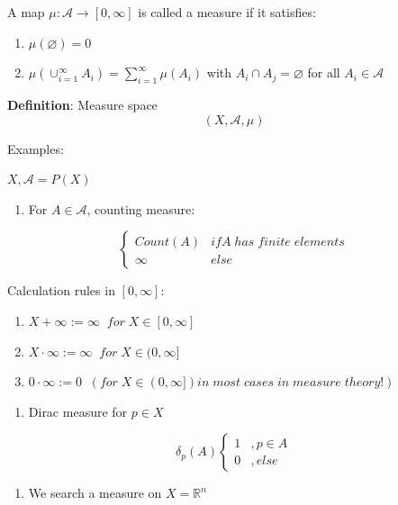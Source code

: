 \documentclass[
]{book}
\providecommand{\tightlist}{%
  \setlength{\itemsep}{0pt}\setlength{\parskip}{0pt}}
\begin{document}
A map \(\mu: \mathcal{A} \rightarrow [0, \infty]\) is called a measure if it satisfies:

\begin{enumerate}
\def\labelenumi{(\alph{enumi})}
\item
  \(\mu (\varnothing)=0\)
\item
  \(\mu(\cup_{i=1}^\infty A_i)=\sum_{i=1}^\infty \mu(A_i)\) with \(A_i \cap A_j = \varnothing\) for all \(A_i \in \mathcal{A}\)
\end{enumerate}

\textbf{Definition}: Measure space \[(X,\mathcal{A}, \mu)\]

Examples:

\(X, \mathcal{A}=P(X)\)

\begin{enumerate}
\def\labelenumi{(\alph{enumi})}
\tightlist
\item
  For \(A\in \mathcal{A}\), counting measure:
\end{enumerate}

\[\begin{cases}  Count(A) & if A \; has\; finite \; elements  \\ \infty & else  \end{cases}\]

Calculation rules in \([0, \infty]\):

\begin{enumerate}
\def\labelenumi{(\arabic{enumi})}
\item
  \(X+\infty := \infty \;\; for \; X \in [0, \infty]\)
\item
  \(X \cdot\infty := \infty \;\; for \; X \in (0, \infty]\)
\item
  \(0 \cdot\infty := 0 \;\; (for \; X \in (0, \infty])in \; most \; cases \; in \; measure \; theory!)\)
\end{enumerate}

\begin{enumerate}
\def\labelenumi{(\alph{enumi})}
\setcounter{enumi}{1}
\tightlist
\item
  Dirac measure for \(p \in X\)
\end{enumerate}

\[\delta_p (A) \begin{cases} 1 &, p \in  A \\ 0 &, else\end{cases}\]

\begin{enumerate}
\def\labelenumi{(\alph{enumi})}
\setcounter{enumi}{2}
\tightlist
\item
  We search a measure on \(X=\mathbb{R}^n\)
\end{enumerate}
\end{document}
